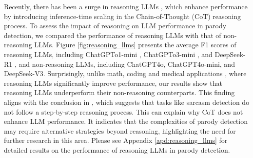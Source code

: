 Recently, there has been a surge in reasoning LLMs \citep{ChatGPT-o1}, which enhance performance by introducing inference-time scaling in the Chain-of-Thought (CoT) \citep{CoT} reasoning process. To assess the impact of reasoning on LLM performance in parody detection, we compared the performance of reasoning LLMs with that of non-reasoning LLMs. Figure \ref{fig:reasoning_llms} presents the average F1 scores of reasoning LLMs, including ChatGPTo1-mini \citep{ChatGPT-o1}, ChatGPTo3-mini \citep{ChatGPT-o3}, and DeepSeek-R1 \citep{DeepSeek-R1}, and non-reasoning LLMs, including ChatGPT4o, ChatGPT4o-mini, and DeepSeek-V3. Surprisingly, unlike math, coding \citep{o1_math} and medical applications \citep{o1_medical}, where reasoning LLMs significantly improve performance, our results show that reasoning LLMs underperform their non-reasoning counterparts. This finding aligns with the conclusion in \citep{yao2024sarcasm}, which suggests that tasks like sarcasm detection do not follow a step-by-step reasoning process. This can explain why CoT does not enhance LLM performance. It indicates that the complexities of parody detection may require alternative strategies beyond reasoning, highlighting the need for further research in this area. Please see Appendix \ref{apd:reasoning_llms} for detailed results on the performance of reasoning LLMs in parody detection.